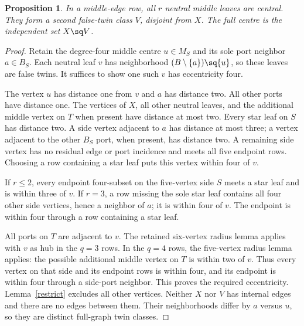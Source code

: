 \documentclass[11pt]{article}
\newtheorem{proposition}[theorem]{Proposition}
\begin{document}
\begin{proposition}\label{middle}
In a middle-edge row, all $r$ neutral middle leaves are central. They
form a second false-twin class $V$, disjoint from $X$. The full centre
is the independent set $X\sq V$.
\end{proposition}
\begin{proof}
Retain the degree-four middle centre $u\in M_S$ and its sole port
neighbor $a\in B_S$. Each neutral leaf $v$ has neighborhood
$(B\setminus\{a\})\sq\{u\}$, so these leaves are false twins.
It suffices to show one such $v$ has eccentricity four.

The vertex $u$ has distance one from $v$ and $a$ has distance two.
All other ports have distance one. The vertices of $X$, all other
neutral leaves, and the additional middle vertex on $T$ when present
have distance at most two. Every star leaf on $S$ has distance two.
A side vertex adjacent to $a$ has distance at most three; a vertex
adjacent to the other $B_S$ port, when present, has distance two.
A remaining side vertex has no residual edge or port incidence and
meets all five endpoint rows. Choosing a row containing a star leaf
puts this vertex within four of $v$.

If $r\leq2$, every endpoint four-subset on the five-vertex side $S$
meets a star leaf and is within three of $v$. If $r=3$, a row missing
the sole star leaf contains all four other side vertices, hence a
neighbor of $a$; it is within four of $v$. The endpoint is within
four through a row containing a star leaf.

All ports on $T$ are adjacent to $v$. The retained six-vertex radius
lemma applies with $v$ as hub in the $q=3$ rows. In the $q=4$ rows,
the five-vertex radius lemma applies: the possible additional middle
vertex on $T$ is within two of $v$. Thus every vertex on that side
and its endpoint rows is within four, and its endpoint is within four
through a side-port neighbor. This proves the required eccentricity.
Lemma~\ref{restrict} excludes all other vertices. Neither $X$ nor $V$
has internal edges and there are no edges between them. Their neighborhoods
differ by $a$ versus $u$, so they are distinct full-graph twin classes.
\end{proof}
\end{document}

